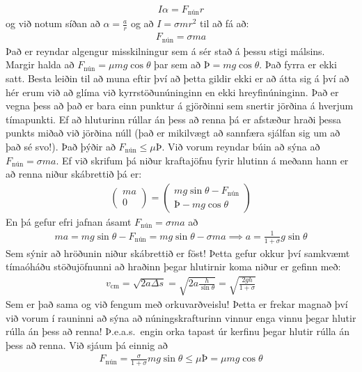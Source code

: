\ifdefined \wholebook \else\documentclass[oneside]{book}\usepackage{EdlBook}\graphicspath{{figures/}}
\begin{document}
\begin{align*}
   I\alpha = F_{\text{nún}}r
\end{align*}
og við notum síðan að $\alpha = \frac{a}{r}$ og að $I = \sigma mr^2$ til að fá að:
\begin{align*}
    F_{\text{nún}} = \sigma m a
\end{align*}
Það er reyndar algengur misskilningur sem á sér stað á þessu stigi málsins. Margir halda að $F_{\text{nún}} = \mu mg\cos\theta$ þar sem að $Þ = mg\cos\theta$. Það fyrra er ekki satt. Besta leiðin til að muna eftir því að þetta gildir ekki er að átta sig á því að hér erum við að glíma við kyrrstöðunúninginn en ekki hreyfinúninginn. Það er vegna þess að það er bara einn punktur á gjörðinni sem snertir jörðina á hverjum tímapunkti. Ef að hluturinn rúllar án þess að renna þá er afstæður hraði þessa punkts miðað við jörðina núll (það er mikilvægt að sannfæra sjálfan sig um að það sé svo!). Það þýðir að $F_{\text{nún}} \leq \mu Þ$. Við vorum reyndar búin að sýna að $F_{\text{nún}} = \sigma ma$. Ef við skrifum þá niður kraftajöfnu fyrir hlutinn á meðann hann er að renna niður skábrettið þá er:
\begin{align*}
    \begin{pmatrix} ma \\ 0 \end{pmatrix} =  \begin{pmatrix} mg\sin\theta - F_{\text{nún}} \\ Þ - mg\cos\theta \end{pmatrix}
\end{align*}
En þá gefur efri jafnan ásamt $F_{\text{nún}} = \sigma ma$ að
\begin{align*}
    ma = mg\sin\theta - F_{\text{nún}} = mg\sin\theta - \sigma ma \implies a = \frac{1}{1+\sigma} g\sin\theta
\end{align*}
Sem sýnir að hröðunin niður skábrettið er föst! Þetta gefur okkur því samkvæmt tímaóháðu stöðujöfnunni að hraðinn þegar hlutirnir koma niður er gefinn með:
\begin{align*}
    v_{\text{cm}} = \sqrt{2a\Delta s} = \sqrt{2a \frac{h}{\sin\theta}} = \sqrt{\frac{2gh}{1+\sigma}}
\end{align*}
Sem er það sama og við fengum með orkuvarðveislu! Þetta er frekar magnað því við vorum í rauninni að sýna að núningskrafturinn vinnur enga vinnu þegar hlutir rúlla án þess að renna! Þ.e.a.s.~engin orka tapast úr kerfinu þegar hlutir rúlla án þess að renna. Við sjáum þá einnig að
\begin{align*}
    F_{\text{nún}} = \frac{\sigma}{1+\sigma} mg\sin\theta \leq \mu Þ = \mu mg\cos\theta
\end{align*}
\end{document}
